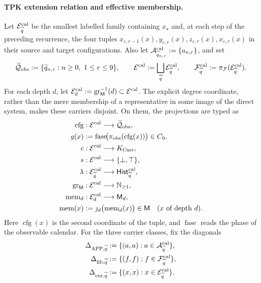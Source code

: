 \paragraph{TPK extension relation and effective membership.}
Let \(\mathcal E^{\rm cal}_{\widetilde q}\) be the smallest labelled family containing
\(x_\star\) and, at each step of the preceding recurrence, the four tuples
\(x_{\varepsilon,r-1}(x),y_{\varepsilon,r}(x),
z_{\varepsilon,r}(x),x_{\varepsilon,r}(x)\) in their source
and target configurations. Also let
\(\mathcal A^{\rm cal}_{\widetilde q_{n,r}}:=\{a_{n,r}\}\), and set
\[
 \widetilde{\mathcal Q}_{\rm obs}:=
   \{\widetilde q_{n,r}:n\ge0,\ 1\le r\le9\},
 \qquad
 \mathcal E^{\rm cal}:=\bigsqcup_{\widetilde q}
     \mathcal E^{\rm cal}_{\widetilde q},
 \qquad
 \mathcal F^{\rm cal}_{\widetilde q}:=
     \pi_{\mathcal F}(\mathcal E^{\rm cal}_{\widetilde q}).
\]
For each depth \(d\), let
\(\mathcal E^{\rm cal}_d:=
\operatorname{gr}_{\mathsf M}^{-1}(d)\subset\mathcal E^{\rm cal}\). The
explicit degree coordinate, rather than the mere membership of a
representative in some image of the direct system, makes these carriers
disjoint. On them, the projections are typed as
\[
\begin{aligned}
 \operatorname{cfg}&:\mathcal E^{\rm cal}\longrightarrow
     \widetilde{\mathcal Q}_{\rm obs},\\
 g(x)&:=\operatorname{fase}\!
       \bigl(\pi_{\rm obs}(\operatorname{cfg}(x))\bigr)\in C_9,\\
 c&:\mathcal E^{\rm cal}\longrightarrow K_{\rm Carr},\\
 s&:\mathcal E^{\rm cal}\longrightarrow\{\bot,\top\},\\
 \lambda&:\mathcal E^{\rm cal}_{\widetilde q}
       \longrightarrow\mathsf{Hist}^{\rm cal}_{\widetilde q},\\
 \operatorname{gr}_{\mathsf M}&:\mathcal E^{\rm cal}
       \longrightarrow\mathbb N_{\ge1},\\
 \operatorname{mem}_d&:\mathcal E^{\rm cal}_d
       \longrightarrow\mathsf M_d,\\
 \operatorname{mem}(x)&:=
       \jmath_d\bigl(\operatorname{mem}_d(x)\bigr)\in\mathsf M
       \quad(x\text{ of depth }d).
\end{aligned}
\]
Here \(\operatorname{cfg}(x)\) is the second coordinate of the tuple, and
\(\operatorname{fase}\) reads the phase of the observable calendar. For the
three carrier classes, fix the diagonals
\[
\begin{aligned}
 \Delta_{\mathrm{APP},\widetilde q}
   &:=\{(a,a):a\in\mathcal A^{\rm cal}_{\widetilde q}\},\\
 \Delta_{{\rm fib},\widetilde q}
   &:=\{(f,f):f\in\mathcal F^{\rm cal}_{\widetilde q}\},\\
 \Delta_{{\rm enr},\widetilde q}
   &:=\{(x,x):x\in\mathcal E^{\rm cal}_{\widetilde q}\}.
\end{aligned}
\]
